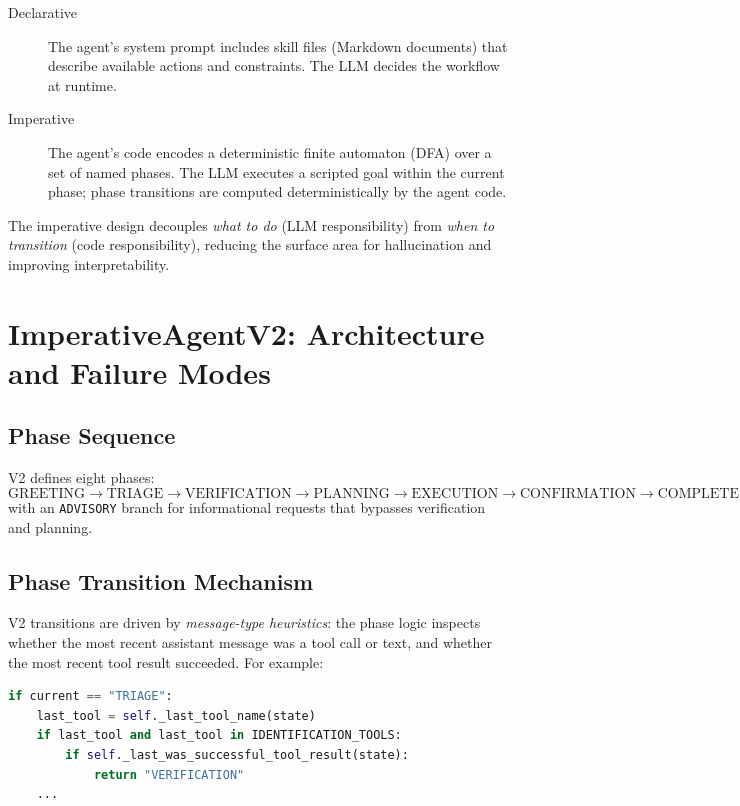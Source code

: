 \documentclass[11pt,a4paper]{article}
\begin{document}
\begin{description}
  \item[Declarative] The agent's system prompt includes skill files (Markdown documents)
    that describe available actions and constraints. The LLM decides the workflow at runtime.
  \item[Imperative] The agent's code encodes a deterministic finite automaton (DFA) over a
    set of named phases. The LLM executes a scripted goal within the current phase; phase
    transitions are computed deterministically by the agent code.
\end{description}

The imperative design decouples \emph{what to do} (LLM responsibility) from
\emph{when to transition} (code responsibility), reducing the surface area for hallucination
and improving interpretability.

\section{ImperativeAgentV2: Architecture and Failure Modes}

\subsection{Phase Sequence}

V2 defines eight phases:
\[
\text{GREETING} \to \text{TRIAGE} \to \text{VERIFICATION} \to \text{PLANNING} \to
\text{EXECUTION} \to \text{CONFIRMATION} \to \text{COMPLETE}
\]
with an \texttt{ADVISORY} branch for informational requests that bypasses verification
and planning.

\subsection{Phase Transition Mechanism}

V2 transitions are driven by \emph{message-type heuristics}: the phase logic inspects
whether the most recent assistant message was a tool call or text, and whether the most
recent tool result succeeded. For example:

\begin{lstlisting}[language=Python, caption={V2 TRIAGE transition logic}]
if current == "TRIAGE":
    last_tool = self._last_tool_name(state)
    if last_tool and last_tool in IDENTIFICATION_TOOLS:
        if self._last_was_successful_tool_result(state):
            return "VERIFICATION"
    ...
\end{lstlisting}
\end{document}
